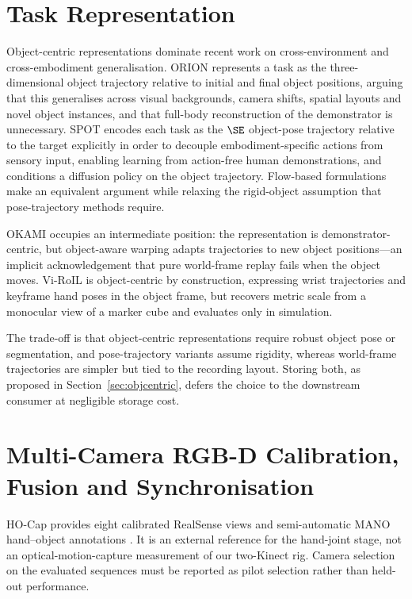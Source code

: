 \section{Task Representation}
\label{sec:lit-repr}

Object-centric representations dominate recent work on cross-environment and
cross-embodiment generalisation. ORION \cite{orion} represents a task as the
three-dimensional object trajectory relative to initial and final object
positions, arguing that this generalises across visual backgrounds, camera
shifts, spatial layouts and novel object instances, and that full-body
reconstruction of the demonstrator is unnecessary. SPOT \cite{spot} encodes each
task as the $\SE$ object-pose trajectory relative to the target explicitly in
order to decouple embodiment-specific actions from sensory input, enabling
learning from action-free human demonstrations, and conditions a diffusion
policy on the object trajectory. Flow-based formulations \cite{novaflow} make an
equivalent argument while relaxing the rigid-object assumption that
pose-trajectory methods require.

OKAMI \cite{okami} occupies an intermediate position: the representation is
demonstrator-centric, but object-aware warping adapts trajectories to new object
positions---an implicit acknowledgement that pure world-frame replay fails when
the object moves. Vi-RoIL \cite{viroil} is object-centric by construction,
expressing wrist trajectories and keyframe hand poses in the object frame, but
recovers metric scale from a monocular view of a marker cube and evaluates only
in simulation.

The trade-off is that object-centric representations require robust object pose
or segmentation, and pose-trajectory variants assume rigidity, whereas
world-frame trajectories are simpler but tied to the recording layout. Storing
both, as proposed in Section~\ref{sec:objcentric}, defers the choice to the
downstream consumer at negligible storage cost.

\section{Multi-Camera RGB-D Calibration, Fusion and Synchronisation}
\label{sec:lit-calib}

HO-Cap provides eight calibrated RealSense views and semi-automatic MANO
hand--object annotations \cite{hocap}. It is an external reference for the
hand-joint stage, not an optical-motion-capture measurement of our two-Kinect
rig. Camera selection on the evaluated sequences must be reported as pilot
selection rather than held-out performance.


